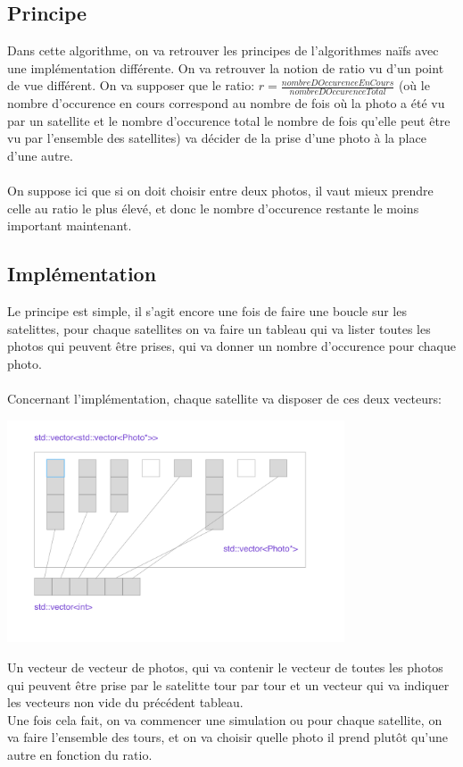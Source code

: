 \documentclass[11pt]{article}
\begin{document}
	\subsection{Principe} %
		\label{sub:principe}
	Dans cette algorithme, on va retrouver les principes de l'algorithmes naïfs avec une implémentation différente. On va retrouver la notion de ratio vu d'un point de vue différent. On va supposer que le ratio: $r=\frac{nombreDOccurenceEnCours}{nombreDOccurenceTotal}$ (où le nombre d'occurence en cours correspond au nombre de fois où la photo a été vu par un satellite et le nombre d'occurence total le nombre de fois qu'elle peut être vu par l'ensemble des satellites) va décider de la prise d'une photo à la place d'une autre.
	\\
	\\
	On suppose ici que si on doit choisir entre deux photos, il vaut mieux prendre celle au ratio le plus élevé, et donc le nombre d'occurence restante le moins important maintenant.


	\subsection{Implémentation} %
		\label{sub:principe}
		Le principe est simple, il s'agit encore une fois de faire une boucle sur les satelittes, pour chaque satellites on va faire un tableau qui va lister toutes les photos qui peuvent être prises, qui va donner un nombre d'occurence pour chaque photo.
		\\
		\\
		Concernant l'implémentation, chaque satellite va disposer de ces deux vecteurs:
		\begin{center}
		\includegraphics [width=100mm]{images/ex1.png} \\[0.5cm]
		\end{center}
		Un vecteur de vecteur de photos, qui va contenir le vecteur de toutes les photos qui peuvent être prise par le satelitte tour par tour et un vecteur qui va indiquer les vecteurs non vide du précédent tableau.
		\\
		Une fois cela fait, on va commencer une simulation ou pour chaque satellite, on va faire l'ensemble des tours, et on va choisir quelle photo il prend plutôt qu'une autre en fonction du ratio.
		
\end{document}
